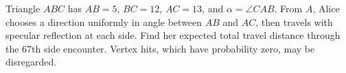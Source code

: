Triangle $ABC$ has $AB=5$, $BC=12$, $AC=13$, and $\alpha=\angle CAB$. From $A$, Alice chooses a direction uniformly in angle between $AB$ and $AC$, then travels with specular reflection at each side. Find her expected total travel distance through the 67th side encounter. Vertex hits, which have probability zero, may be disregarded.

